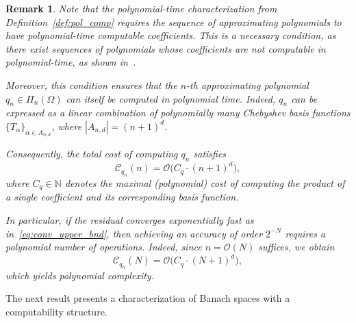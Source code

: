 \documentclass[pdflatex]{sn-jnl}%
\newtheorem{theorem}{Theorem}[section]%
\newtheorem{remark}[theorem]{Remark}
\begin{document}
\begin{remark}
    Note that the polynomial-time characterization from Definition~\ref{def:pol_comp} requires the sequence of approximating polynomials to have polynomial-time computable coefficients. This is a necessary condition, as there exist sequences of polynomials whose coefficients are not computable in polynomial-time, as shown in~\cite{Boche2026-kq}.  

   Moreover, this condition ensures that the $n$-th approximating polynomial $q_n \in \Pi_n(\Omega)$ can itself be computed in polynomial time. Indeed, $q_n$ can be expressed as a linear combination of polynomially many Chebyshev basis functions $\{T_\alpha\}_{\alpha \in A_{n,d}}$, where $|A_{n,d}| = (n+1)^d$.

Consequently, the total cost of computing $q_n$ satisfies
\begin{equation}
    \mathcal{C}_{q_n}(n) = \mathcal{O}\big(C_q\cdot(n+1)^d\big),
\end{equation}
where $C_q\in \mathbb{N}$ denotes the maximal (polynomial) cost of computing the product of a single coefficient and its corresponding basis function.

In particular, if the residual converges exponentially fast as in~\eqref{eq:conv_upper_bnd}, then achieving an accuracy of order $2^{-N}$ requires a polynomial number of operations. Indeed, since $n = \mathcal{O}(N)$ suffices, we obtain
\begin{equation}
    \mathcal{C}_{q_n}(N) = \mathcal{O}\big(C_q\cdot(N+1)^d\big),
\end{equation}
which yields polynomial complexity.
\end{remark}
The next result presents a characterization of Banach spaces with a computability structure. 
\end{document}
